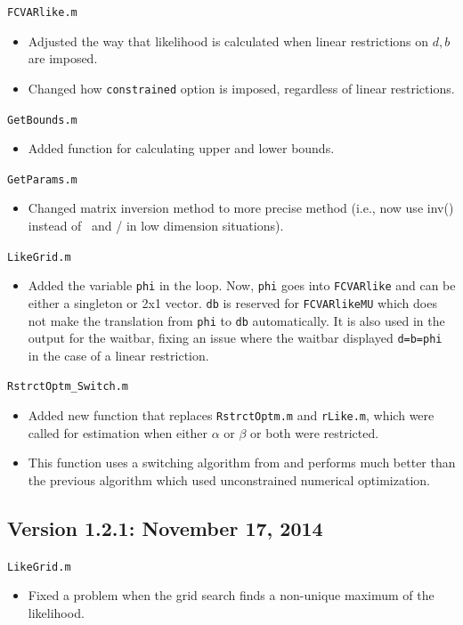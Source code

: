 \documentclass[10pt]{article}
\begin{document}
\noindent \verb|FCVARlike.m|
\begin{itemize}
\item Adjusted the way that likelihood is calculated when linear restrictions on $d,b$ are imposed. 
\item Changed how \verb|constrained| option is imposed, regardless of linear restrictions.
\end{itemize}

\noindent \verb|GetBounds.m|
\begin{itemize}
\item Added function for calculating upper and lower bounds.
\end{itemize}

\noindent \verb|GetParams.m|
\begin{itemize}
\item Changed matrix inversion method to more precise method (i.e., now use inv() instead of \ and / in low dimension situations).
\end{itemize}

\noindent \verb|LikeGrid.m|
\begin{itemize}
\item Added the variable \verb|phi| in the loop. Now, \verb|phi| goes into \verb|FCVARlike| and can be either a singleton or 2x1 vector. \verb|db| is reserved for \verb|FCVARlikeMU| which does not make the translation from \verb|phi| to \verb|db| automatically. It is also used in the output for the waitbar, fixing an issue where the waitbar displayed \verb|d=b=phi| in the case of a linear restriction.
\end{itemize}

\noindent \verb|RstrctOptm_Switch.m|
\begin{itemize}
\item Added new function that replaces \verb|RstrctOptm.m| and \verb|rLike.m|, which were called for estimation when either $\alpha$ or $\beta$ or both were restricted.
\item This function uses a switching algorithm from \cite{Boswijk2004} and performs much better than the previous algorithm which used unconstrained numerical optimization. 
\end{itemize}

\subsection{Version 1.2.1: November 17, 2014}

\noindent \verb|LikeGrid.m|
\begin{itemize}
\item Fixed a problem when the grid search finds a non-unique maximum of the likelihood. 
\end{itemize}
\end{document}
